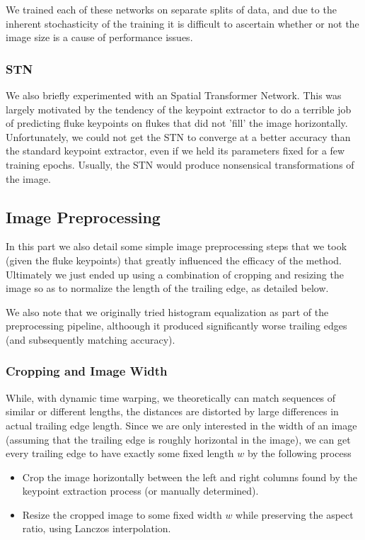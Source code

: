 We trained each of these networks on separate splits of data, and due to the inherent stochasticity of the training it is difficult to ascertain whether or not the image size is a cause of performance issues. 


\subsubsection{STN} %

We also briefly experimented with an Spatial Transformer Network.
This was largely motivated by the tendency of the keypoint extractor to do a terrible job of predicting fluke keypoints on flukes that did not 'fill' the image horizontally.
Unfortunately, we could not get the STN to converge at a better accuracy than the standard keypoint extractor, even if we held its parameters fixed for a few training epochs.
Usually, the STN would produce nonsensical transformations of the image.


\subsection{Image Preprocessing}

In this part we also detail some simple image preprocessing steps that we took (given the fluke keypoints) that greatly influenced the efficacy of the method.
Ultimately we just ended up using a combination of cropping and resizing the image so as to normalize the length of the trailing edge, as detailed below.

We also note that we originally tried histogram equalization as part of the preprocessing pipeline, althoough it produced significantly worse trailing edges (and subsequently matching accuracy).

\subsubsection{Cropping and Image Width}

While, with dynamic time warping, we theoretically can match sequences of similar or different lengths, the distances are distorted by large differences in actual trailing edge length.
Since we are only interested in the width of an image (assuming that the trailing edge is roughly horizontal in the image), we can get every trailing edge to have exactly some fixed length $w$ by the following process

\begin{itemize}
    \item Crop the image horizontally between the left and right columns found by the keypoint extraction process (or manually determined).
    \item Resize the cropped image to some fixed width $w$ while preserving the aspect ratio, using Lanczos interpolation. %
\end{itemize}

